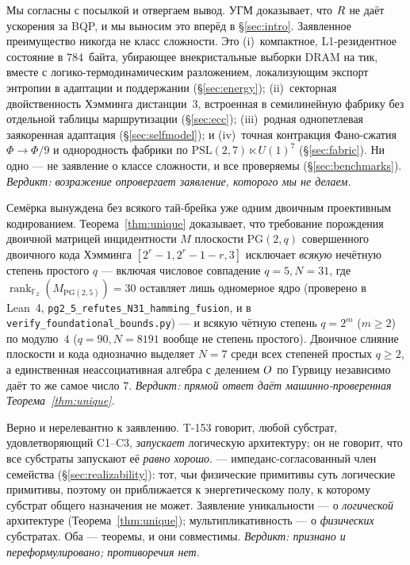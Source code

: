 \begin{redteambox}
Мы согласны с посылкой и отвергаем вывод. УГМ доказывает, что $R$ не даёт
ускорения за BQP, и мы выносим это вперёд в \S\ref{sec:intro}. Заявленное
преимущество никогда не класс сложности. Это (i)~компактное, L1-резидентное
состояние в $784$~байта, убирающее внекристальные выборки DRAM на тик, вместе с
логико-термодинамическим разложением, локализующим экспорт энтропии в адаптации
и поддержании (\S\ref{sec:energy}); (ii)~секторная двойственность Хэмминга
дистанции~$3$, встроенная в семилинейную фабрику без отдельной таблицы
маршрутизации (\S\ref{sec:ecc}); (iii)~родная однопетлевая заякоренная
адаптация (\S\ref{sec:selfmodel}); и (iv)~точная контракция Фано-сжатия
$\Phi\to\Phi/9$ и однородность фабрики по $\mathrm{PSL}(2,7)\ltimes U(1)^7$
(\S\ref{sec:fabric}). Ни одно --- не заявление о классе сложности, и все
проверяемы (\S\ref{sec:benchmarks}). \emph{Вердикт: возражение опровергает
заявление, которого мы не делаем.}
\end{redteambox}

\begin{redteambox}
Семёрка вынуждена без всякого тай-брейка уже одним двоичным проективным
кодированием. Теорема~\ref{thm:unique} доказывает, что требование порождения
двоичной матрицей инцидентности $M$ плоскости $\mathrm{PG}(2,q)$ совершенного
двоичного кода Хэмминга $[2^r{-}1,2^r{-}1{-}r,3]$ исключает \emph{всякую}
нечётную степень простого $q$ --- включая числовое совпадение $q=5, N=31$, где
$\operatorname{rank}_{\mathbb{F}_2}(M_{\mathrm{PG}(2,5)})=30$ оставляет лишь
одномерное ядро (проверено в Lean~4,
\texttt{pg2\_5\_refutes\_N31\_hamming\_fusion}, и в
\texttt{verify\_foundational\_bounds.py}) --- и всякую чётную степень
$q=2^m$ ($m\ge 2$) по модулю~$4$ ($q=90, N=8191$ вообще не степень простого).
Двоичное слияние плоскости и кода однозначно выделяет $N=7$ среди всех степеней
простых $q\ge 2$, а единственная неассоциативная алгебра с делением $O$ по
Гурвицу независимо даёт то же самое число $7$. \emph{Вердикт: прямой ответ
даёт машинно-проверенная Теорема~\ref{thm:unique}.}
\end{redteambox}

\begin{redteambox}
Верно и нерелевантно к заявлению. T-153 говорит, любой субстрат, удовлетворяющий
C1--C3, \emph{запускает} логическую архитектуру; он не говорит, что все субстраты
запускают её \emph{равно хорошо}. \TALOS{} --- импеданс-согласованный член
семейства (\S\ref{sec:realizability}): тот, чьи физические примитивы суть
логические примитивы, поэтому он приближается к энергетическому полу, к которому
субстрат общего назначения не может. Заявление уникальности --- о
\emph{логической} архитектуре (Теорема~\ref{thm:unique}); мультипликативность ---
о \emph{физических} субстратах. Оба --- теоремы, и они совместимы. \emph{Вердикт:
признано и переформулировано; противоречия нет.}
\end{redteambox}

